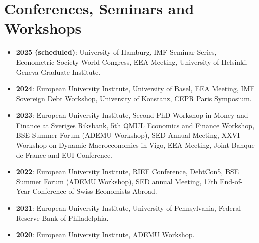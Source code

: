 \documentclass[letterpaper,11pt]{article}
\makeatletter
\newcommand{\resumeItem}[2]{
  \item\small{
    \textbf{#1}{: #2 \vspace{-2pt}}
  }
}
\newcommand{\resumeSubheading}[4]{
  \vspace{-1pt}\item
    \begin{tabular*}{0.97\textwidth}{l@{\extracolsep{\fill}}r}
      \textbf{#1} & #2 \\
      \textit{\small#3} & \textit{\small #4} \\
    \end{tabular*}\vspace{-5pt}
}
\newcommand{\resumeSubItem}[2]{\resumeItem{#1}{#2}\vspace{-1pt}}
\newcommand{\resumeSubHeadingListStart}{\begin{itemize}[leftmargin=*]}
\newcommand{\resumeSubHeadingListEnd}{\end{itemize}}
\makeatother
\begin{document}
\section{Conferences, Seminars and Workshops}
\resumeSubHeadingListStart
\resumeSubItem{2025 (scheduled)}{University of Hamburg, IMF Seminar Series, Econometric Society World Congress, EEA Meeting, University of Helsinki, Geneva Graduate Institute.}
\resumeSubItem{2024}{European University Institute, University of Basel, EEA Meeting, IMF Sovereign Debt Workshop, University of Konstanz, CEPR Paris Symposium.}
\resumeSubItem{2023}{European University Institute, Second PhD Workshop in Money and Finance at Sveriges Riksbank, 5th QMUL Economics and Finance Workshop, BSE Summer Forum (ADEMU Workshop), SED Annual Meeting, XXVI Workshop on Dynamic Macroeconomics in Vigo, EEA Meeting, Joint Banque de France and EUI Conference.}
\resumeSubItem{2022}{European University Institute, RIEF Conference, DebtCon5, BSE Summer Forum (ADEMU Workshop), SED annual Meeting, 17th End-of-Year Conference of Swiss Economists Abroad.}
\resumeSubItem{2021}{European University Institute, University of Pennsylvania, Federal Reserve Bank of Philadelphia.}
\resumeSubItem{2020}{European University Institute, ADEMU Workshop.}
\resumeSubHeadingListEnd

%
      

      
      
      
      
      
      
      
\end{document}
